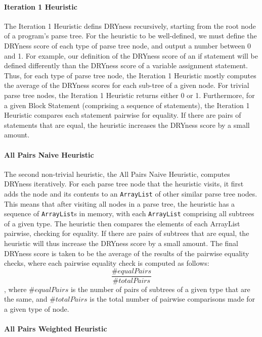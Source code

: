 \documentclass{article}
\begin{document}
\paragraph{Iteration 1 Heuristic}

The Iteration 1 Heuristic defins DRYness recursively, 
starting from the root node of a program's parse tree. For the heuristic to be well-defined, we must define the DRYness score of
each type of parse tree node, and output a number between 0 and 1. For example, our definition of the DRYness score of an if statement
will be defined differently than the DRYness score of a variable assignment statement. Thus, for each type of parse tree node,
the Iteration 1 Heuristic mostly computes the average of the DRYness scores for each sub-tree of a given node. For trivial parse
tree nodes, the Iteration 1 Heuristic returns either 0 or 1. Furthermore, for a given Block Statement (comprising a sequence of statements), 
the Iteration 1 Heuristic compares each statement pairwise for equality. If there are pairs of statements that are equal, the 
heuristic increases the DRYness score by a small amount.

\paragraph{All Pairs Naive Heuristic}

The second non-trivial heuristic, the All Pairs Naive Heuristic, computes DRYness iteratively. 
For each parse tree node that the heuristic visits, it first adds the node and its contents to an \texttt{ArrayList} of other similar
parse tree nodes. This means that after visiting all nodes in a parse tree, the heuristic has a sequence of \texttt{ArrayList}s
in memory, with each \texttt{ArrayList} comprising all subtrees of a given type. The heuristic then compares the elements of each
ArrayList pairwise, checking for equality. If there are pairs of subtrees that are equal, the heuristic will thus increase the
DRYness score by a small amount. The final DRYness score is taken to be the average of the results of the pairwise equality checks,
where each pairwise equality check is computed as follows: $$\frac{\#equalPairs}{\#totalPairs}$$, where $\#equalPairs$ is the
number of pairs of subtrees of a given type that are the same, and $\#totalPairs$ is the total number of pairwise comparisons made
for a given type of node.

\paragraph{All Pairs Weighted Heuristic}
\end{document}
